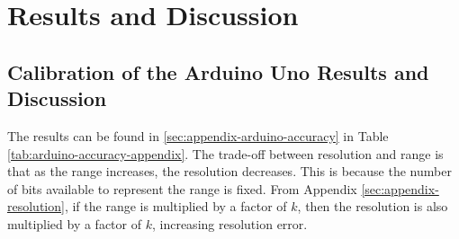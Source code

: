 \section{Results and Discussion}

\subsection{Calibration of the Arduino Uno Results and Discussion}
\noindent The results can be found in \ref{sec:appendix-arduino-accuracy} in Table \ref{tab:arduino-accuracy-appendix}.
The trade-off between resolution and range is that as the range increases, the resolution decreases. This is because the number of bits
available to represent the range is fixed. From Appendix \ref{sec:appendix-resolution}, if the range is multiplied by a factor of $k$, then the resolution is also multiplied by a factor of $k$, increasing resolution error.

